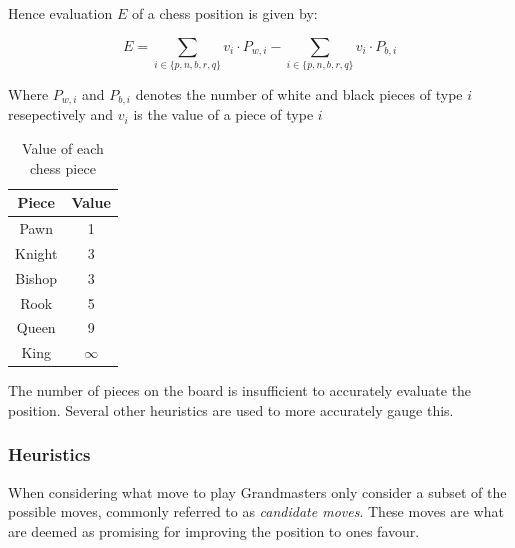 Hence evaluation \( E \) of a chess position is given by:

\[
E = \sum_{i \in \{ p, n, b, r, q \}} v_i \cdot P_{w,i} - \sum_{i \in \{ p, n, b, r, q \}} v_i \cdot P_{b,i}
\]

Where \(P_{w,i}\) and  \(P_{b,i}\) denotes the number of white and black pieces of type \(i\) resepectively and \(v_i\) is the value of a piece of type \(i\)

\begin{table}[H]
    \centering
    \begin{tabular}{ ||c c|| } 
      \hline
      Piece & Value\\ 
      \hline\hline
      Pawn & 1 \\ 
      \hline
      Knight & 3 \\
      \hline
      Bishop & 3 \\
      \hline
      Rook & 5 \\
      \hline
      Queen & 9 \\
      \hline
      King & $\infty$ \\
      \hline
    \end{tabular}
    \caption{Value of each chess piece}
    \label{tab:valTable}
\end{table}


The number of pieces on the board is insufficient to accurately evaluate the position. Several other heuristics are used to more accurately gauge this.

\subsubsection{Heuristics}
\label{subsubsec: Heuristics}
When considering what move to play Grandmasters only consider a subset of the possible moves, commonly referred to as \textit{candidate moves}. These moves are what are deemed as promising for improving the position to ones favour.

